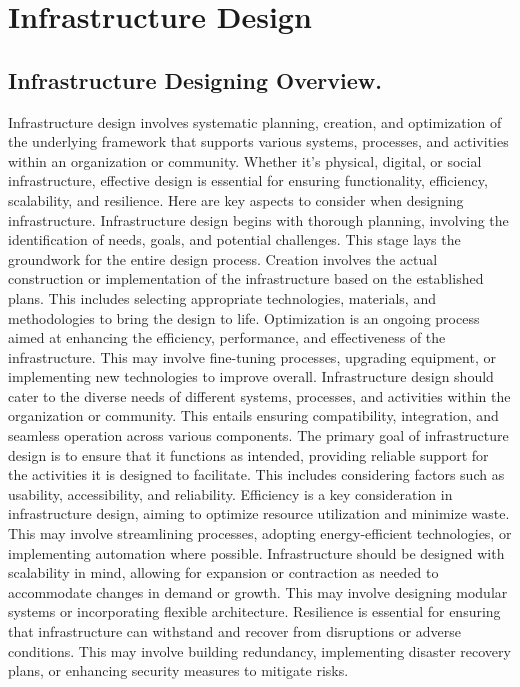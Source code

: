
\chapter{Infrastructure Design}
\label{chap:2}
\section{Infrastructure Designing Overview.}
Infrastructure design involves systematic planning, creation, and optimization of the underlying framework that supports various systems, processes, and activities within an organization or community. Whether it's physical, digital, or social infrastructure, effective design is essential for ensuring functionality, efficiency, scalability, and resilience. Here are key aspects to consider when designing infrastructure.
Infrastructure design begins with thorough planning, involving the identification of needs, goals, and potential challenges. This stage lays the groundwork for the entire design process.
Creation involves the actual construction or implementation of the infrastructure based on the established plans. This includes selecting appropriate technologies, materials, and methodologies to bring the design to life.
Optimization is an ongoing process aimed at enhancing the efficiency, performance, and effectiveness of the infrastructure. This may involve fine-tuning processes, upgrading equipment, or implementing new technologies to improve overall. 
Infrastructure design should cater to the diverse needs of different systems, processes, and activities within the organization or community. This entails ensuring compatibility, integration, and seamless operation across various components.
The primary goal of infrastructure design is to ensure that it functions as intended, providing reliable support for the activities it is designed to facilitate. This includes considering factors such as usability, accessibility, and reliability.
Efficiency is a key consideration in infrastructure design, aiming to optimize resource utilization and minimize waste. This may involve streamlining processes, adopting energy-efficient technologies, or implementing automation where possible.
Infrastructure should be designed with scalability in mind, allowing for expansion or contraction as needed to accommodate changes in demand or growth. This may involve designing modular systems or incorporating flexible architecture.
Resilience is essential for ensuring that infrastructure can withstand and recover from disruptions or adverse conditions. This may involve building redundancy, implementing disaster recovery plans, or enhancing security measures to mitigate risks. \cite{DSR}



